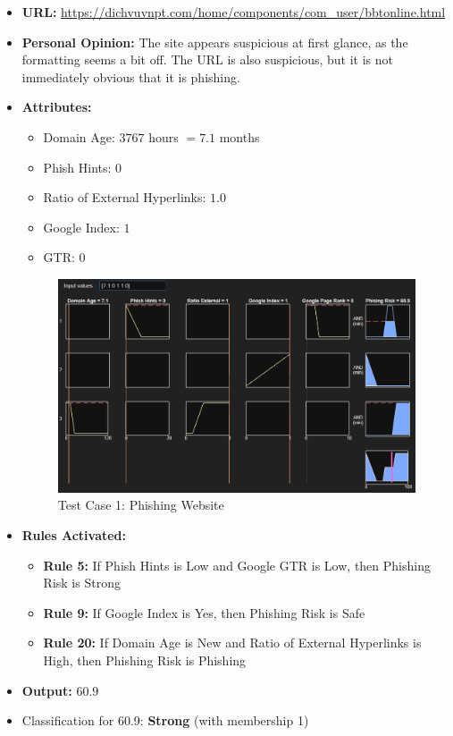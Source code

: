 \documentclass[11pt]{article}
\begin{document}
\begin{itemize}
    \item \textbf{URL:} \url{https://dichvuvnpt.com/home/components/com_user/bbtonline.html}
    \item \textbf{Personal Opinion:} The site appears suspicious at first glance, as the formatting seems a bit off. The URL is also suspicious, but it is not immediately obvious that it is phishing.
    \item \textbf{Attributes:}
    \begin{itemize}
        \item Domain Age: $3767$ hours $= 7.1$ months
        \item Phish Hints: $0$
        \item Ratio of External Hyperlinks: $1.0$
        \item Google Index: $1$
        \item GTR: $0$
    \end{itemize}
    \begin{figure}[h!]
        \centering
        \includegraphics[width=\textwidth]{test-1.png}
        \caption{Test Case 1: Phishing Website}
    \end{figure}
    \item \textbf{Rules Activated:} 
    \begin{itemize}
        \item \textbf{Rule 5:} If Phish Hints is Low and Google GTR is Low, then Phishing Risk is Strong
        \item \textbf{Rule 9:} If Google Index is Yes, then Phishing Risk is Safe
        \item \textbf{Rule 20:} If Domain Age is New and Ratio of External Hyperlinks is High, then Phishing Risk is Phishing
    \end{itemize}
    \item \textbf{Output:} $60.9$
    \item Classification for 60.9: \textbf{Strong} (with membership 1)
\end{itemize}
\end{document}
